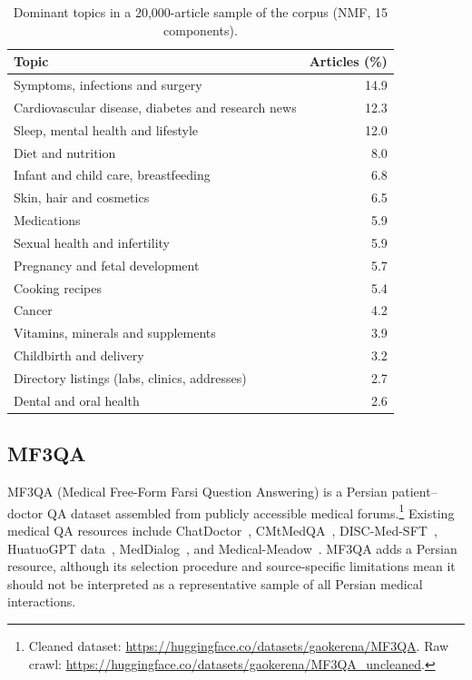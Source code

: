 \documentclass[manuscript,screen,review]{acmart}
\begin{document}
\begin{table}[ht]
\caption{Dominant topics in a 20,000-article sample of the corpus (NMF, 15 components).}\label{tab:corpus_topics}
\begin{tabular}{@{}lr@{}}
\toprule
Topic & Articles (\%) \\
\midrule
Symptoms, infections and surgery & 14.9 \\
Cardiovascular disease, diabetes and research news & 12.3 \\
Sleep, mental health and lifestyle & 12.0 \\
Diet and nutrition & 8.0 \\
Infant and child care, breastfeeding & 6.8 \\
Skin, hair and cosmetics & 6.5 \\
Medications & 5.9 \\
Sexual health and infertility & 5.9 \\
Pregnancy and fetal development & 5.7 \\
Cooking recipes & 5.4 \\
Cancer & 4.2 \\
Vitamins, minerals and supplements & 3.9 \\
Childbirth and delivery & 3.2 \\
Directory listings (labs, clinics, addresses) & 2.7 \\
Dental and oral health & 2.6 \\
\bottomrule
\end{tabular}
\end{table}

\subsection{MF3QA}\label{subsec3.2}

MF3QA (Medical Free-Form Farsi Question Answering) is a Persian patient--doctor QA dataset assembled from publicly accessible medical forums.\footnote{Cleaned dataset: \url{https://huggingface.co/datasets/gaokerena/MF3QA}. Raw crawl: \url{https://huggingface.co/datasets/gaokerena/MF3QA_uncleaned}.} Existing medical QA resources include ChatDoctor~\cite{b18}, CMtMedQA~\cite{b19}, DISC-Med-SFT~\cite{b20}, HuatuoGPT data~\cite{b21,b22}, MedDialog~\cite{b23}, and Medical-Meadow~\cite{b24}. MF3QA adds a Persian resource, although its selection procedure and source-specific limitations mean it should not be interpreted as a representative sample of all Persian medical interactions.
\end{document}
